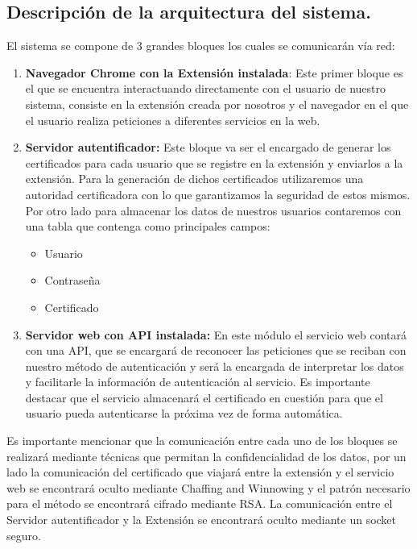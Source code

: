 \documentclass[12pt, a4paper, titlepage]{report}
\begin{document}
	        \subsection{Descripci\'on de la arquitectura del sistema.}
	            El sistema se compone de 3 grandes bloques los cuales se comunicar\'an v\'ia red:
	            \begin{enumerate}
	                \item \textbf{Navegador Chrome con la Extensi\'on instalada}: Este primer bloque es el que se encuentra interactuando directamente con el usuario de nuestro sistema, consiste en la extensión creada por nosotros y el navegador en el que el usuario realiza peticiones a diferentes servicios en la web.
	                \item \textbf{Servidor autentificador:} Este bloque va ser el encargado de generar los certificados para cada usuario que se registre en la extensión y enviarlos a la extensión. Para la generación de dichos certificados utilizaremos una autoridad certificadora con lo que garantizamos la seguridad de estos mismos. Por otro lado para almacenar los datos de nuestros usuarios contaremos con una tabla que contenga como principales campos:
	                    \begin{itemize}
	                        \item Usuario
	                        \item Contraseña
	                        \item Certificado
	                    \end{itemize}
	                \item \textbf{Servidor web con API instalada: }En este módulo el servicio web contar\'a con una API, que se encargará de reconocer las peticiones que se reciban con nuestro método de autenticación y ser\'a la encargada de interpretar los datos y facilitarle la informaci\'on de autenticaci\'on al servicio.
	                Es importante destacar que el servicio almacenar\'a el certificado en cuesti\'on para que el usuario pueda autenticarse la próxima vez de forma automática.
	            \end{enumerate}
	        
	        Es importante mencionar que la comunicaci\'on entre cada uno de los bloques se realizar\'a mediante t\'ecnicas que permitan la confidencialidad de los datos, por un lado la comunicación del certificado que viajará entre la extensión y el servicio web se encontrará oculto mediante Chaffing and Winnowing y el patr\'on necesario para el m\'etodo se encontrar\'a cifrado mediante RSA. La comunicación entre el Servidor autentificador y la Extensión se encontrar\'a oculto mediante un socket seguro. 
	        
\end{document}

